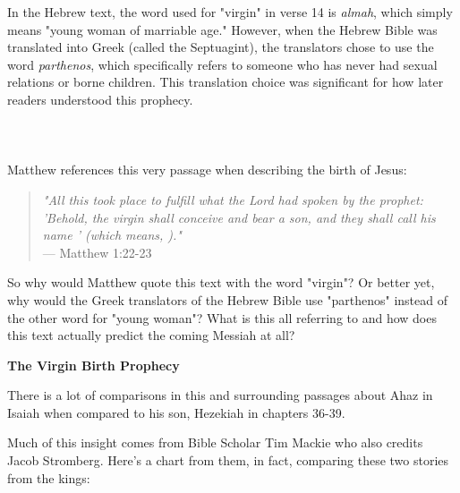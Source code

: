 \documentclass[11pt]{article}
\begin{document}
In the Hebrew text, the word used for "virgin" in verse 14 is \textit{almah}, which simply means "young woman of marriable age." However, when the Hebrew Bible was translated into Greek (called the Septuagint), the translators chose to use the word \textit{parthenos}, which specifically refers to someone who has never had sexual relations or borne children. This translation choice was significant for how later readers understood this prophecy.
\\\\\\\\
Matthew references this very passage when describing the birth of Jesus:
\\
\begin{quote}
\textit{"All this took place to fulfill what the Lord had spoken by the prophet: 'Behold, the virgin shall conceive and bear a son, and they shall call his name ' (which means, )."} \\
\hfill --- Matthew 1:22-23
\end{quote}
{\vspace{1em}}
So why would Matthew quote this text with the word "virgin"? Or better yet, why would the Greek translators of the Hebrew Bible use "parthenos" instead of the other word for "young woman"? What is this all referring to and how does this text actually predict the coming Messiah at all?


\vspace{3em}
{\large\bfseries The Virgin Birth Prophecy}
\vspace{1em}

There is a lot of comparisons in this and surrounding passages about Ahaz in Isaiah when compared to his son, Hezekiah in chapters 36-39.

Much of this insight comes from Bible Scholar Tim Mackie who also credits Jacob Stromberg. Here's a chart from them, in fact, comparing these two stories from the kings:
\end{document}
